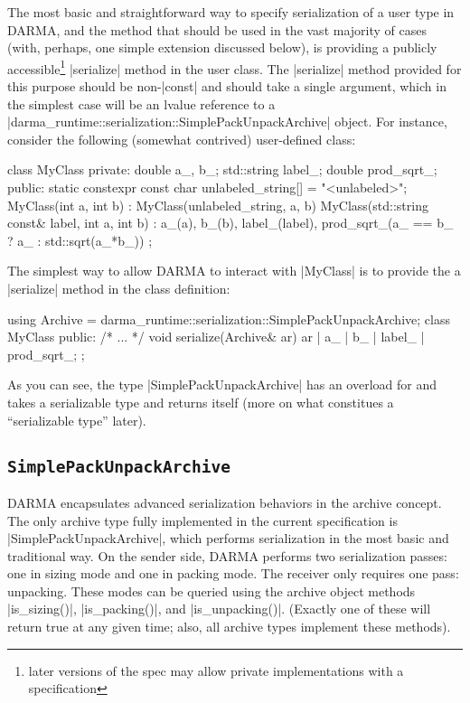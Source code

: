 The most basic and straightforward way to specify serialization of a user type
in DARMA, and the method that should be used in the vast majority of cases
(with, perhaps, one simple extension discussed below), is providing a publicly
accessible\footnote{later versions of the spec may allow private
implementations with a  specification} |serialize| method
in the user class.  The |serialize| method provided for this purpose should be
non-|const| and should take a single argument, which in the simplest case will
be an lvalue reference to a
|darma_runtime::serialization::SimplePackUnpackArchive| object.  For instance,
consider the following (somewhat contrived) user-defined class:
%
\begin{CppCodeNumb}
class MyClass {
  private:
    double a_, b_;
    std::string label_;
    double prod_sqrt_;
  public:
    static constexpr const char unlabeled_string[] = "<unlabeled>";
    MyClass(int a, int b)
      : MyClass(unlabeled_string, a, b)
    { }
    MyClass(std::string const& label, int a, int b)
      : a_(a), b_(b), label_(label),
        prod_sqrt_(a_ == b_ ? a_ : std::sqrt(a_*b_))
    { }
};
\end{CppCodeNumb}
%
The simplest way to allow DARMA to interact with |MyClass| is to provide the
a |serialize| method in the class definition:
\begin{CppCodeNumb}
using Archive = darma_runtime::serialization::SimplePackUnpackArchive;
class MyClass {
  public:
    /* ... */
    void serialize(Archive& ar) {
      ar | a_ | b_ | label_ | prod_sqrt_;
    }
};
\end{CppCodeNumb}
As you can see, the type |SimplePackUnpackArchive| has an overload for
 and takes a serializable type and returns itself (more
on what constitues a ``serializable type'' later).

\subsection{\texttt{SimplePackUnpackArchive}}

DARMA encapsulates advanced serialization behaviors in the archive
\gls{concept}.  The only archive type fully implemented in the current
specification is |SimplePackUnpackArchive|, which performs serialization in the
most basic and traditional way.  On the sender side, DARMA performs
two serialization passes: one in sizing mode and one in packing mode.  The receiver
only requires one pass: unpacking.  These modes can be queried using the archive
object methods |is_sizing()|, |is_packing()|, and |is_unpacking()|.  (Exactly
one of these will return true at any given time; also, all archive types
implement these methods).

